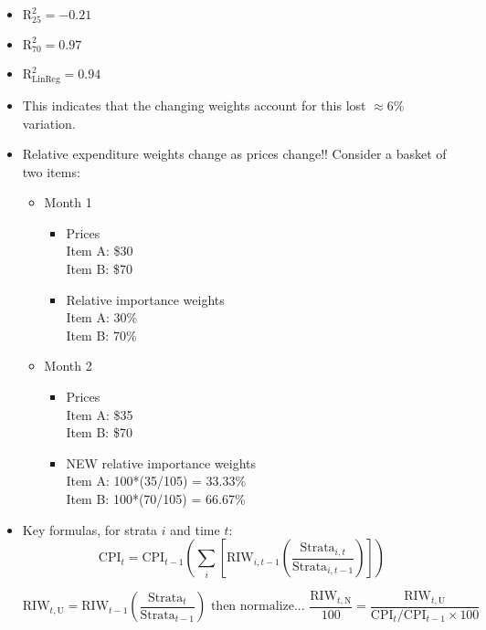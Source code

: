 \documentclass{article}
\begin{document}
\begin{itemize}
\item $\text{R}^{2}_{25} = -0.21$
\item $\text{R}^{2}_{70} = 0.97$
\item $\text{R}^{2}_{\text{LinReg}} = 0.94$
\item This indicates that the changing weights account for this lost $\approx 6\%$ variation.
\item Relative expenditure weights change as prices change!! Consider a basket of two items: 
\begin{itemize}
\item Month 1
    \begin{itemize}
    \item Prices \\
    Item A: \$30 \\
    Item B: \$70 \\
    \item Relative importance weights \\
    Item A: 30\% \\
    Item B: 70\%
    \end{itemize}
\item Month 2
    \begin{itemize}
    \item Prices \\
    Item A: \$35 \\
    Item B: \$70
    \item NEW relative importance weights \\
    Item A: 100*(35/105) = 33.33\% \\
    Item B: 100*(70/105) = 66.67\%
    \end{itemize}
\end{itemize}
\item Key formulas, for strata $i$ and time $t$:
$$ \text{CPI}_{t} = \text{CPI}_{t-1} \left(
  \sum_{i} \left[
    \text{RIW}_{i,t-1} \left(
      \frac{\text{Strata}_{i,t}}{\text{Strata}_{i,t-1}}
    \right)
  \right]
\right) $$

$$ \text{RIW}_{t, \text{U}} = \text{RIW}_{t-1} \left(
  \frac{\text{Strata}_{t}}{\text{Strata}_{t-1}}
  \right) \text{ then normalize... } \frac{\text{RIW}_{t, \text{N}}}{100} = \frac{\text{RIW}_{t, \text{U}}}{\text{CPI}_{t}/\text{CPI}_{t-1} \times 100}$$
  

\end{itemize}
\end{document}
